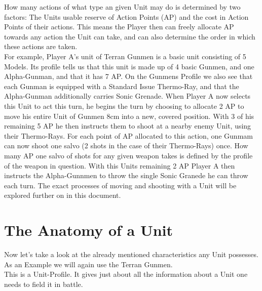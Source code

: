 \documentclass[a4paper,12pt]{report}
\begin{document}
How many actions of what type an given Unit may do is determined by two factors: The Units usable reserve of Action Points (AP) and the cost in Action Points of their actions. This means the Player then can freely allocate AP towards any action the Unit can take, and can also determine the order in which these actions are taken.\\
 For example, Player A's unit of Terran Gunmen is a basic unit consisting of 5 Models. Its profile tells us that this unit is made up of  4 basic Gunmen, and one Alpha-Gunman, and that it has 7 AP. On the Gunmens Profile we also see that each Gunman is equipped with a Standard Issue Thermo-Ray, and that the Alpha-Gunman additionally carries Sonic Grenade. When Player A now selects this Unit to act this turn, he begins the turn by choosing to allocate 2 AP to move his entire Unit of Gunmen 8cm into a new, covered position. With 3 of his remaining 5 AP he then instructs them to shoot at a nearby enemy Unit, using their Thermo-Rays. For each point of AP allocated to this action, one Gunmam can now shoot one salvo (2 shots in the case of their Thermo-Rays) once. How many AP one salvo of shots for any given weapon takes is defined by the profile of the weapon in question. With this Units remaining 2 AP Player A then instructs the Alpha-Gunnmen to throw the single Sonic Granede he can throw each turn. The exact processes of moving and shooting with a Unit will be explored further on in this document.\\
 \newpage
 \section{The Anatomy of a Unit}
 Now let's take a look at the already mentioned characteristics any Unit possesses. As an Example we will again use the Terran Gunmen.\\
 This is a Unit-Profile. It gives just about all the information about a Unit one needs to field it in battle.
 
\end{document}

